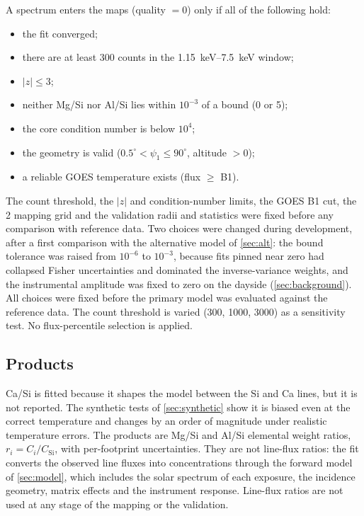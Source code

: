 A spectrum enters the maps (quality $=0$) only if all of the following hold:
\begin{itemize}
\item the fit converged;
\item there are at least 300 counts in the \SIrange{1.15}{7.5}{keV} window;
\item $|z|\le3$;
\item neither Mg/Si nor Al/Si lies within $10^{-3}$ of a bound (0 or 5);
\item the core condition number is below $10^4$;
\item the geometry is valid ($0.5^\circ<\psi_1\le 90^\circ$, altitude $>0$);
\item a reliable GOES temperature exists (flux $\ge$ B1).
\end{itemize}
The count threshold, the $|z|$ and condition-number limits, the GOES B1 cut, the 2\textdegree{} mapping grid and the validation radii and statistics were fixed before any comparison with reference data. Two choices were changed during development, after a first comparison with the alternative model of \cref{sec:alt}: the bound tolerance was raised from $10^{-6}$ to $10^{-3}$, because fits pinned near zero had collapsed Fisher uncertainties and dominated the inverse-variance weights, and the instrumental amplitude was fixed to zero on the dayside (\cref{sec:background}). All choices were fixed before the primary model was evaluated against the reference data. The count threshold is varied (300, 1000, 3000) as a sensitivity test. No flux-percentile selection is applied.

\subsection{Products}\label{sec:products}
Ca/Si is fitted because it shapes the model between the Si and Ca lines, but it is not reported. The synthetic tests of \cref{sec:synthetic} show it is biased even at the correct temperature and changes by an order of magnitude under realistic temperature errors. The products are Mg/Si and Al/Si elemental weight ratios, $r_i=C_i/C_\mathrm{Si}$, with per-footprint uncertainties. They are not line-flux ratios: the fit converts the observed line fluxes into concentrations through the forward model of \cref{sec:model}, which includes the solar spectrum of each exposure, the incidence geometry, matrix effects and the instrument response. Line-flux ratios are not used at any stage of the mapping or the validation.
